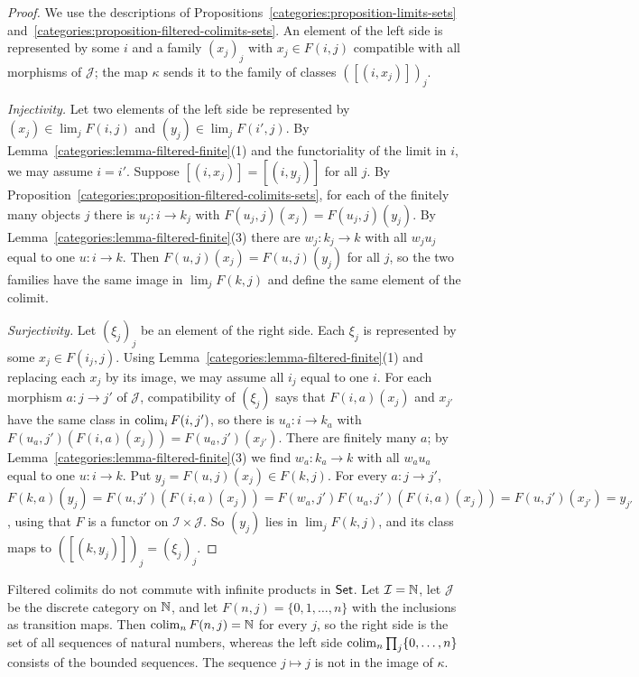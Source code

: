 \begin{proof}
We use the descriptions of Propositions~\ref{categories:proposition-limits-sets}
and~\ref{categories:proposition-filtered-colimits-sets}. An element of the left
side is represented by some $i$ and a family $(x_j)_j$ with $x_j \in F(i, j)$
compatible with all morphisms of $\mathcal{J}$; the map $\kappa$ sends it to the
family of classes $([(i, x_j)])_j$.

\emph{Injectivity.} Let two elements of the left side be represented by
$(x_j) \in \lim_j F(i, j)$ and $(y_j) \in \lim_j F(i', j)$. By
Lemma~\ref{categories:lemma-filtered-finite}(1) and the functoriality of the
limit in $i$, we may assume $i = i'$. Suppose $[(i, x_j)] = [(i, y_j)]$ for all
$j$. By Proposition~\ref{categories:proposition-filtered-colimits-sets}, for each
of the finitely many objects $j$ there is $u_j \colon i \to k_j$ with
$F(u_j, j)(x_j) = F(u_j, j)(y_j)$. By Lemma~\ref{categories:lemma-filtered-finite}(3)
there are $w_j \colon k_j \to k$ with all $w_j u_j$ equal to one $u \colon i \to k$. Then
$F(u, j)(x_j) = F(u, j)(y_j)$ for all $j$, so the two families have the same image in
$\lim_j F(k, j)$ and define the same element of the colimit.

\emph{Surjectivity.} Let $(\xi_j)_j$ be an element of the right side. Each
$\xi_j$ is represented by some $x_j \in F(i_j, j)$. Using
Lemma~\ref{categories:lemma-filtered-finite}(1) and replacing each $x_j$ by its image,
we may assume all $i_j$ equal to one $i$. For each morphism $a \colon j \to j'$ of
$\mathcal{J}$, compatibility of $(\xi_j)$ says that $F(i, a)(x_j)$ and $x_{j'}$ have the
same class in $\operatorname*{colim}_i F(i, j')$, so there is $u_a \colon i \to k_a$ with
$F(u_a, j')(F(i, a)(x_j)) = F(u_a, j')(x_{j'})$. There are finitely many $a$; by
Lemma~\ref{categories:lemma-filtered-finite}(3) we find $w_a \colon k_a \to k$ with all
$w_a u_a$ equal to one $u \colon i \to k$. Put $y_j = F(u, j)(x_j) \in F(k, j)$. For every
$a \colon j \to j'$,
$F(k, a)(y_j) = F(u, j')(F(i, a)(x_j)) = F(w_a, j')F(u_a, j')(F(i,a)(x_j)) = F(u, j')(x_{j'}) = y_{j'}$,
using that $F$ is a functor on $\mathcal{I} \times \mathcal{J}$. So $(y_j)$ lies in
$\lim_j F(k, j)$, and its class maps to $([(k, y_j)])_j = (\xi_j)_j$.
\end{proof}

\begin{counterexample}\label{categories:counterexample-filtered-infinite-products}
Filtered colimits do not commute with infinite products in $\mathsf{Set}$. Let
$\mathcal{I} = \mathbb{N}$, let $\mathcal{J}$ be the discrete category on $\mathbb{N}$, and let
$F(n, j) = \{0, 1, \ldots, n\}$ with the inclusions as transition maps. Then
$\operatorname*{colim}_n F(n, j) = \mathbb{N}$ for every $j$, so the right side is the set of all
sequences of natural numbers, whereas the left side
$\operatorname*{colim}_n \prod_j \{0, \ldots, n\}$ consists of the bounded sequences. The sequence
$j \mapsto j$ is not in the image of $\kappa$.
\end{counterexample}


